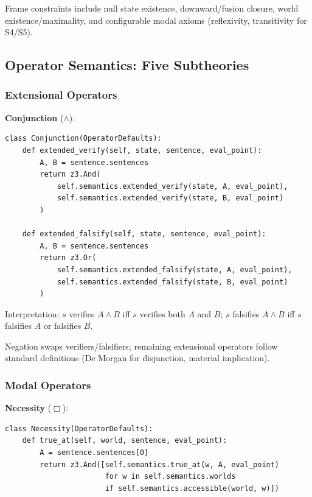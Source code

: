 \documentclass[pdflatex,sn-mathphys-num]{sn-jnl}
\newcommand{\nec}{\Box}                     %
\theoremstyle{thmstyleone}
\theoremstyle{thmstyletwo}
\theoremstyle{thmstylethree}
\begin{document}
Frame constraints include null state existence, downward/fusion closure, world existence/maximality, and configurable modal axioms (reflexivity, transitivity for S4/S5).

\subsection{Operator Semantics: Five Subtheories}\label{sec:operator-semantics}

\subsubsection{Extensional Operators}

\textbf{Conjunction} ($\land$):
\begin{lstlisting}[caption={Conjunction operator}]
class Conjunction(OperatorDefaults):
    def extended_verify(self, state, sentence, eval_point):
        A, B = sentence.sentences
        return z3.And(
            self.semantics.extended_verify(state, A, eval_point),
            self.semantics.extended_verify(state, B, eval_point)
        )

    def extended_falsify(self, state, sentence, eval_point):
        A, B = sentence.sentences
        return z3.Or(
            self.semantics.extended_falsify(state, A, eval_point),
            self.semantics.extended_falsify(state, B, eval_point)
        )
\end{lstlisting}

Interpretation: $s$ verifies $A \land B$ iff $s$ verifies both $A$ and $B$; $s$ falsifies $A \land B$ iff $s$ falsifies $A$ or falsifies $B$.

Negation swaps verifiers/falsifiers; remaining extensional operators follow standard definitions (De Morgan for disjunction, material implication).

\subsubsection{Modal Operators}

\textbf{Necessity} ($\nec$):
\begin{lstlisting}[caption={Necessity operator}]
class Necessity(OperatorDefaults):
    def true_at(self, world, sentence, eval_point):
        A = sentence.sentences[0]
        return z3.And([self.semantics.true_at(w, A, eval_point)
                       for w in self.semantics.worlds
                       if self.semantics.accessible(world, w)])
\end{lstlisting}
\end{document}

